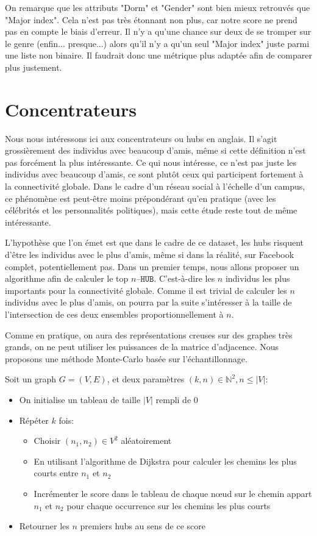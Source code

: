 \documentclass{article}
\begin{document}
On remarque que les attributs "Dorm" et "Gender" sont bien mieux retrouvés que "Major index".
Cela n'est pas très étonnant non plus, car notre score ne prend pas en compte le biais d'erreur.
Il n'y a qu'une chance sur deux de se tromper sur le genre (enfin... presque...) alors qu'il n'y a qu'un seul "Major index" juste parmi une liste non binaire.
Il faudrait donc une métrique plus adaptée afin de comparer plus justement.

\section{Concentrateurs}

Nous nous intéressons ici aux concentrateurs ou hubs en anglais. Il s'agit grossièrement des individus avec beaucoup d'amis, même si cette définition n'est pas forcément la plus intéressante.
Ce qui nous intéresse, ce n'est pas juste les individus avec beaucoup d'amis, ce sont plutôt ceux qui participent fortement à la connectivité globale.
Dans le cadre d'un réseau social à l'échelle d'un campus, ce phénomène est peut-être moins prépondérant qu'en pratique (avec les célébrités et les personnalités politiques), mais cette étude reste tout de même intéressante.

L'hypothèse que l'on émet est que dans le cadre de ce dataset, les hubs risquent d'être les individus avec le plus d'amis, même si dans la réalité, sur Facebook complet, potentiellement pas.
Dans un premier temps, nous allons proposer un algorithme afin de calculer le top $n\textrm{--}\texttt{HUB}$.
C'est-à-dire les $n$ individus les plus importants pour la connectivité globale. Comme il est trivial de calculer les $n$ individus avec le plus d'amis, on pourra par la suite s'intéresser à la taille de l'intersection de ces deux ensembles proportionnellement à $n$.

Comme en pratique, on aura des représentations creuses sur des graphes très grands, on ne peut utiliser les puissances de la matrice d'adjacence.
Nous proposons une méthode Monte-Carlo basée sur l'échantillonnage.

Soit un graph $G = (V, E)$, et deux paramètres $(k, n) \in \mathbb N^2, n \le |V|$:

\begin{itemize}
    \item On initialise un tableau de taille $|V|$ rempli de $0$
    \item Répéter $k$ fois:
    \begin{itemize}
        \item Choisir $(n_1, n_2) \in V^2$ aléatoirement
        \item En utilisant l'algorithme de Dijkstra pour calculer les chemins les plus courts entre $n_1$ et $n_2$
        \item Incrémenter le score dans le tableau de chaque nœud sur le chemin appart $n_1$ et $n_2$ pour chaque occurrence sur les chemins les plus courts
    \end{itemize}
    \item Retourner les $n$ premiers hubs au sens de ce score
\end{itemize}
\end{document}
